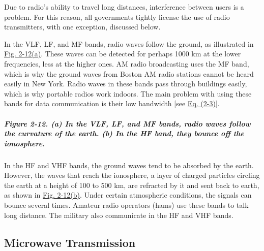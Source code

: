 \documentclass[b5paper,11pt]{memoir}
\begin{document}
Due to radio's ability to travel long distances, interference between
users is a problem. For this reason, all governments tightly license the
use of radio transmitters, with one exception, discussed below.

In the VLF, LF, and MF bands, radio waves follow the ground, as
illustrated in
\protect\hyperlink{0130661023_ch02lev1sec3.htmlux5cux23ch02fig12}{Fig.
2-12(a)}. These waves can be detected for perhaps 1000 km at the lower
frequencies, less at the higher ones. AM radio broadcasting uses the MF
band, which is why the ground waves from Boston AM radio stations cannot
be heard easily in New York. Radio waves in these bands pass through
buildings easily, which is why portable radios work indoors. The main
problem with using these bands for data communication is their low
bandwidth {[}see
\protect\hyperlink{0130661023_ch02lev1sec3.htmlux5cux23ch02eq03}{Eq.
(2-3)}{]}.

\subparagraph[Figure 2-12. (a) In the VLF, LF, and MF bands, radio waves
follow the curvature of the earth. (b) In the HF band, they bounce off
the
ionosphere.]{\texorpdfstring{\protect\hypertarget{0130661023_ch02lev1sec3.htmlux5cux23ch02fig12}{}{}Figure
2-12. (a) In the VLF, LF, and MF bands, radio waves follow the curvature
of the earth. (b) In the HF band, they bounce off the
ionosphere.}{Figure 2-12. (a) In the VLF, LF, and MF bands, radio waves follow the curvature of the earth. (b) In the HF band, they bounce off the ionosphere.}}


In the HF and VHF bands, the ground waves tend to be absorbed by the
earth. However, the waves that reach the ionosphere, a layer of charged
particles circling the earth at a height of 100 to 500 km, are refracted
by it and sent back to earth, as shown in
\protect\hyperlink{0130661023_ch02lev1sec3.htmlux5cux23ch02fig12}{Fig.
2-12(b)}. Under certain atmospheric conditions, the signals can bounce
several times. Amateur radio operators (hams) use these bands to talk
long distance. The military also communicate in the HF and VHF bands.

\protect\hypertarget{0130661023_ch02lev1sec3.htmlux5cux23ch02lev2sec10}{}{}

\subsection{Microwave Transmission}
\end{document}

